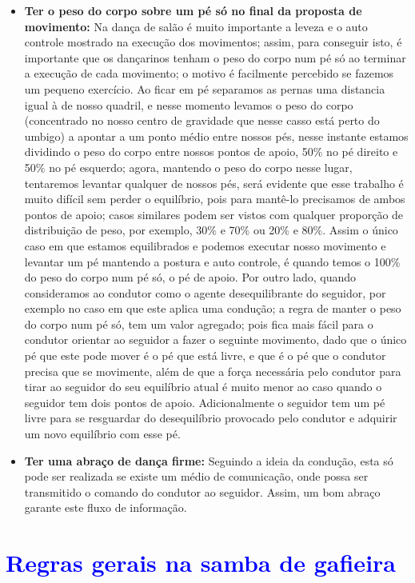 \begin{itemize}
\item \textbf{Ter o peso do corpo sobre um pé só no final da proposta de movimento:} 
Na dança de salão é muito importante a leveza e o auto controle mostrado na 
execução dos movimentos; assim, para conseguir isto, é importante que os dançarinos
tenham o peso do corpo num pé só ao terminar a execução de cada movimento; o motivo
é facilmente percebido se fazemos um pequeno exercício. Ao ficar em pé separamos as
pernas uma distancia igual à de nosso quadril, e nesse momento levamos o peso do corpo
(concentrado no nosso centro de gravidade que nesse casso está perto do umbigo) a
apontar a um ponto médio entre nossos pés, nesse instante estamos dividindo o peso do corpo
entre nossos pontos de apoio, 50$\%$ no pé direito e 50$\%$ no pé esquerdo; agora, mantendo o peso
do corpo nesse lugar, tentaremos levantar qualquer de nossos pés, será evidente
que esse trabalho é muito difícil sem perder o equilíbrio, pois para mantê-lo
precisamos de ambos pontos de apoio; casos similares podem ser vistos com qualquer proporção de distribuição de peso,
por exemplo, 30$\%$ e 70$\%$ ou 20$\%$ e 80$\%$. Assim o único caso em que estamos
equilibrados e podemos executar nosso movimento e levantar um pé 
mantendo a postura e auto controle, é quando
temos o 100$\%$ do peso do corpo num pé só, o pé de apoio. 
Por outro lado, quando consideramos ao condutor como o agente desequilibrante do seguidor, por exemplo no caso
em que este aplica uma condução;
a regra de manter o peso do corpo num pé só, tem um valor agregado; 
pois fica mais fácil para o condutor orientar
ao seguidor a fazer o seguinte movimento, dado que o único pé que este pode mover é o pé
que está livre, e que é o pé que o condutor precisa que se movimente, 
além de que a força necessária pelo condutor para tirar ao seguidor do seu equilíbrio 
atual é muito menor ao caso quando o seguidor tem dois pontos de apoio.
Adicionalmente o seguidor tem um pé livre para se resguardar do desequilíbrio provocado pelo 
condutor e adquirir um novo equilíbrio com esse pé.

\item \textbf{Ter uma abraço de dança firme:} Seguindo a ideia da condução, esta só pode
ser realizada se existe um médio de comunicação, onde possa ser transmitido
o comando do condutor ao seguidor. Assim, um bom abraço garante este
fluxo de informação.
\end{itemize}

\section{\textcolor{blue}{Regras gerais na samba de gafieira}}


